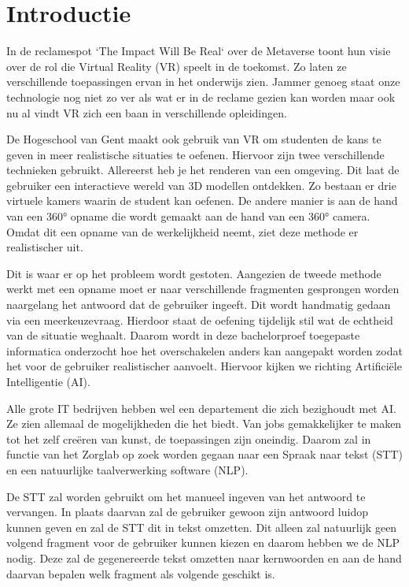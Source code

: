 
\section{Introductie}%
\label{sec:introductie}

In de reclamespot `The Impact Will Be Real` over de Metaverse toont \textcite{Meta2022} hun visie over de rol die Virtual Reality (VR) speelt in de toekomst. Zo laten ze verschillende toepassingen ervan in het onderwijs zien. Jammer genoeg staat onze technologie nog niet zo ver als wat er in de reclame gezien kan worden maar ook nu al vindt VR zich een baan in verschillende opleidingen.

De Hogeschool van Gent maakt ook gebruik van VR om studenten de kans te geven in meer realistische situaties te oefenen. Hiervoor zijn twee verschillende technieken gebruikt. Allereerst heb je het renderen van een omgeving. Dit laat de gebruiker een interactieve wereld van 3D modellen ontdekken. Zo bestaan er drie virtuele kamers waarin de student kan oefenen. De andere manier is aan de hand van een 360° opname die wordt gemaakt aan de hand van een 360° camera. Omdat dit een opname van de werkelijkheid neemt, ziet deze methode er realistischer uit.

Dit is waar er op het probleem wordt gestoten. Aangezien de tweede methode werkt met een opname moet er naar verschillende fragmenten gesprongen worden naargelang het antwoord dat de gebruiker ingeeft. Dit wordt handmatig gedaan via een meerkeuzevraag. Hierdoor staat de oefening tijdelijk stil wat de echtheid van de situatie weghaalt. Daarom wordt in deze bachelorproef toegepaste informatica onderzocht hoe het overschakelen anders kan aangepakt worden zodat het voor de gebruiker realistischer aanvoelt. Hiervoor kijken we richting Artificiële Intelligentie (AI).

Alle grote IT bedrijven hebben wel een departement die zich bezighoudt met AI. Ze zien allemaal de mogelijkheden die het biedt. Van jobs gemakkelijker te maken tot het zelf creëren van kunst, de toepassingen zijn oneindig. Daarom zal in functie van het Zorglab op zoek worden gegaan naar een Spraak naar tekst (STT) en een natuurlijke taalverwerking software (NLP).

De STT zal worden gebruikt om het manueel ingeven van het antwoord te vervangen. In plaats daarvan zal de gebruiker gewoon zijn antwoord luidop kunnen geven en zal de STT dit in tekst omzetten. Dit alleen zal natuurlijk geen volgend fragment voor de gebruiker kunnen kiezen en daarom hebben we de NLP nodig. Deze zal de gegenereerde tekst omzetten naar kernwoorden en aan de hand daarvan bepalen welk fragment als volgende geschikt is.



